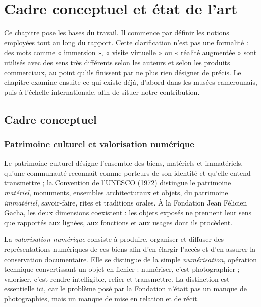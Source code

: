 \chapter{Cadre conceptuel et état de l'art}
\label{chap:cadre}

\introchap

Ce chapitre pose les bases du travail. Il commence par définir les notions
employées tout au long du rapport. Cette clarification n'est pas une formalité :
des mots comme « immersion », « visite virtuelle » ou « réalité augmentée » sont
utilisés avec des sens très différents selon les auteurs et selon les produits
commerciaux, au point qu'ils finissent par ne plus rien désigner de précis. Le
chapitre examine ensuite ce qui existe déjà, d'abord dans les musées
camerounais, puis à l'échelle internationale, afin de situer notre contribution.

\section{Cadre conceptuel}
\label{sec:conceptuel}

\subsection{Patrimoine culturel et valorisation numérique}

Le patrimoine culturel désigne l'ensemble des biens, matériels et immatériels,
qu'une communauté reconnaît comme porteurs de son identité et qu'elle entend
transmettre ; la Convention de l'UNESCO (1972) distingue le patrimoine
\emph{matériel}, monuments, ensembles architecturaux et objets, du patrimoine
\emph{immatériel}, savoir-faire, rites et traditions orales. À la Fondation Jean
Félicien Gacha, les deux dimensions coexistent : les objets exposés ne prennent
leur sens que rapportés aux lignées, aux fonctions et aux usages dont ils
procèdent.

La \emph{valorisation numérique} consiste à produire, organiser et diffuser des
représentations numériques de ces biens afin d'en élargir l'accès et d'en
assurer la conservation documentaire. Elle se distingue de la simple
\emph{numérisation}, opération technique convertissant un objet en fichier :
numériser, c'est photographier ; valoriser, c'est rendre intelligible, relier et
transmettre. La distinction est essentielle ici, car le problème posé par la
Fondation n'était pas un manque de photographies, mais un manque de mise en
relation et de récit.

